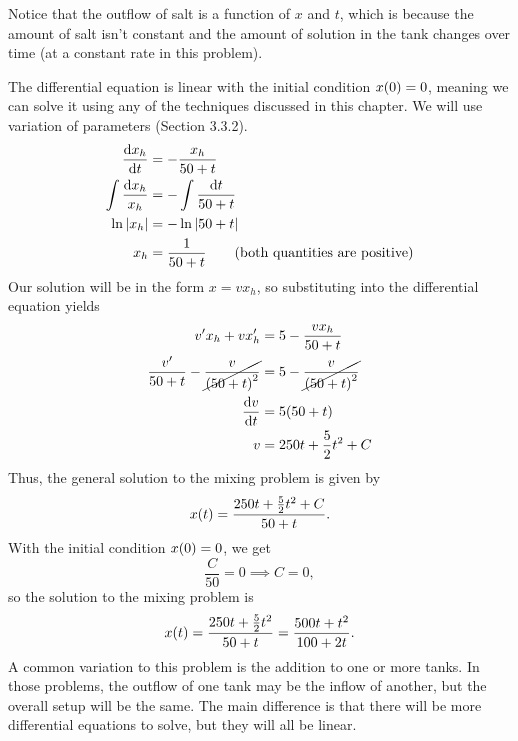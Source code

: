 Notice that the outflow of salt is a function of $x$ and $t$, which is because the amount of salt isn't constant and the amount of solution in the tank changes over time (at a constant rate in this problem).
\par\bigskip
The differential equation is linear with the initial condition $x\p{0} = 0$, meaning we can solve it using any of the techniques discussed in this chapter. We will use variation of parameters (Section 3.3.2).
\begin{align*}
	\frac{\diff{x_h}}{\diff{t}} &= -\frac{x_h}{50 + t} \\
	\int\frac{\diff{x_h}}{x_h} &= -\int\frac{\diff{t}}{50 + t} \\
	\ln{\abs{x_h}} &= -\ln{\abs{50 + t}} \\
	x_h &= \frac{1}{50 + t} \qquad \text{(both quantities are positive)}
\end{align*}
Our solution will be in the form $x = vx_h$, so substituting into the differential equation yields
\begin{align*}
	v'x_h + vx_h' &= 5 - \frac{vx_h}{50 + t} \\
	\frac{v'}{50 + t} - \cancel{\frac{v}{\p{50 + t}^2}} &= 5 - \cancel{\frac{v}{\p{50 + t}^2}} \\
	\frac{\diff{v}}{\diff{t}} &= 5\p{50 + t} \\
	v &= 250t + \frac{5}{2}t^2 + C
\end{align*}
Thus, the general solution to the mixing problem is given by \[ x\p{t} = \frac{250t + \frac{5}{2}t^{2} + C}{50 + t}. \] With the initial condition $x\p{0} = 0$, we get \[ \frac{C}{50} = 0 \implies C = 0, \] so the solution to the mixing problem is \[ x\p{t} = \frac{250t + \frac{5}{2}t^2}{50 + t} = \frac{500t + t^2}{100 + 2t}. \] A common variation to this problem is the addition to one or more tanks. In those problems, the outflow of one tank may be the inflow of another, but the overall setup will be the same. The main difference is that there will be more differential equations to solve, but they will all be linear.